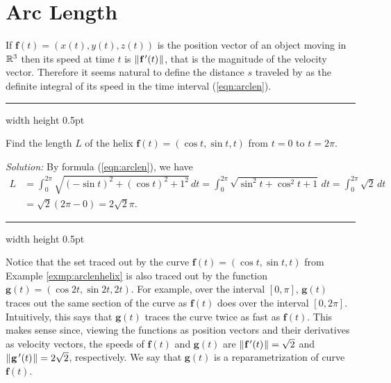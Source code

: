 \section{Arc Length}

If $\textbf{f}(t) = (x(t),y(t),z(t))$ is the position vector of an object moving in $\mathbb{R}^{3}$ then 
its speed at time $t$ is $\lVert\mspace{1mu}\textbf{f}\,'(t)\mspace{1mu}\rVert$,
that is the magnitude  of the velocity vector.
Therefore it seems natural to define the distance $s$
traveled by as the definite integral of its speed in the time interval (\ref{eqn:arclen}).

\vspace{2mm}
\hrule width \textwidth height 0.5pt
\begin{exmp}\label{exmp:arclenhelix}
 Find the length $L$ of the helix $\textbf{f}(t) = ( \cos t , \sin t , t )$ from $t = 0$ to $t =
 2\pi$.\vspace{1mm}
 \par\noindent \emph{Solution:} 
 By formula (\ref{eqn:arclen}), we have
 \begin{align*}
  L &= \int_{0}^{2\pi} \sqrt{(-\sin t)^2 + (\cos t)^2 + 1^2}\,dt 
  = \int_{0}^{2\pi} \sqrt{\sin^2 t + \cos^2 t + 1}\,dt 
  = \int_{0}^{2\pi} \sqrt{2}\,dt\\
  &= \sqrt{2} (2\pi - 0) = 2\sqrt{2}\pi.
 \end{align*}
\end{exmp}
\hrule width \textwidth height 0.5pt
\vspace{2mm}

Notice that the set traced out by the curve $\textbf{f}(t) = (\cos t , \sin t , t)$ from Example
\ref{exmp:arclenhelix} is also traced out by the function $\textbf{g}(t) = (\cos 2t , \sin 2t , 2t)$.
For example, over the interval $[0,\pi]$, $\textbf{g}(t)$ traces out the same section of the curve as $\textbf{f}(t)$
does over the interval $[0,2\pi]$. Intuitively, this says that $\textbf{g}(t)$ traces the curve twice as fast as
$\textbf{f}(t)$. This makes sense since, viewing the functions as position vectors and their derivatives as velocity
vectors, the speeds of $\textbf{f}(t)$ and $\textbf{g}(t)$ are $\lVert\mspace{1mu}\textbf{f}\,'(t)\mspace{1mu}\rVert = \sqrt{2}$ and
$\lVert\mspace{1mu}\textbf{g}\,'(t)\mspace{1mu}\rVert = 2\sqrt{2}$, respectively. 
We say that $\textbf{g}(t)$ is a reparametrization of curve $\textbf{f}(t)$.

